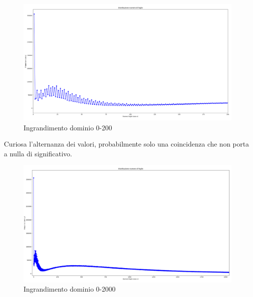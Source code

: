 \documentclass[a4paper,12pt]{report} %
\begin{document}
\begin{figure}[h!]
    \centering
    \includegraphics[width=1\textwidth]{imgs/grafico_0_200.png} %
    \caption{Ingrandimento dominio 0-200}
    \label{fig:etichetta}
\end{figure}

Curiosa l'alternanza dei valori, probabilmente solo una coincidenza che non porta a nulla di significativo.

\begin{figure}[h!]
    \centering
    \includegraphics[width=1\textwidth]{imgs/grafico_0_2000.png} %
    \caption{Ingrandimento dominio 0-2000}
    \label{fig:etichetta}
\end{figure}
\end{document}
